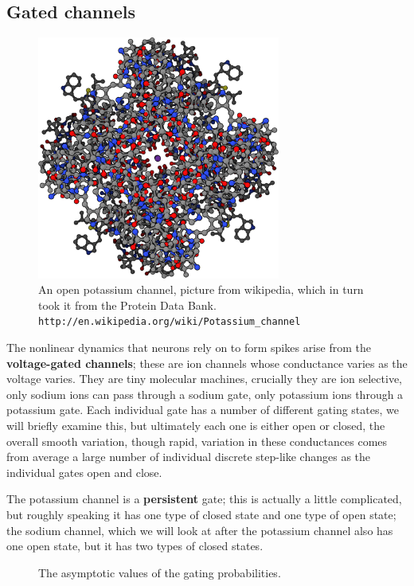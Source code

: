\documentclass[11pt,a4paper]{scrartcl}
\begin{document}
\subsection*{Gated channels}

\begin{figure}
\begin{center}
\includegraphics[width=8cm]{potassium_channel.png}
\end{center}
\caption{An open potassium channel, picture from  wikipedia, which in turn took it from the Protein Data Bank. \texttt{http://en.wikipedia.org/wiki/Potassium\_channel}}
\end{figure}

The nonlinear dynamics that neurons rely on to form spikes arise from
the \textbf{voltage-gated channels}; these are ion channels whose
conductance varies as the voltage varies. They are tiny molecular
machines, crucially they are ion selective, only sodium ions can pass
through a sodium gate, only potassium ions through a potassium
gate. Each individual gate has a number of different gating states, we
will briefly examine this, but ultimately each one is either open or
closed, the overall smooth variation, though rapid, variation in these
conductances comes from average a large number of individual discrete
step-like changes as the individual gates open and close.

The potassium channel is a \textbf{persistent} gate; this is actually
a little complicated, but roughly speaking it has one type of closed
state and one type of open state; the sodium channel, which we will
look at after the potassium channel also has one open state, but it
has two types of closed states. 

\begin{figure}
\begin{center}

\end{center}
\caption{The asymptotic values of the gating probabilities.\label{fig:asymp_vals}}
\end{figure}
\end{document}
